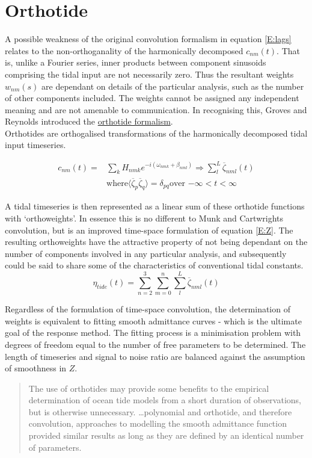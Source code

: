 \section{Orthotide}%
A possible weakness of the original convolution formalism in equation \ref{E:lags} relates to the non-orthoganality of the harmonically decomposed $c_{nm}(t)$.  That is, unlike a Fourier series, inner products between component sinusoids comprising the tidal input are not necessarily zero.   Thus the resultant weights $w_{nm}(s)$ are dependant on details of the particular analysis, such as the number of other components included.  The weights cannot be assigned any independent meaning and are not amenable to communication.  In recognising this, Groves and Reynolds \citep {Groves:1975ky} introduced the \underline{orthotide formalism}.\\
Orthotides are orthogalised transformations of the harmonically decomposed tidal input timeseries.

\begin{align}
c_{nm}(t) =  &\sum_{k} H_{nmk} e^{-i(\omega_{nmk} + \beta_{nml})}  \Rightarrow \sum_{l}^L \overline{\zeta}_{nml}(t)     \nonumber \\
             &\mbox{where} \langle \overline{\zeta}_p \overline{\zeta}_q \rangle  = \delta_{pq}  \mbox{over $-\infty < t < \infty$}             \nonumber
\end{align}

A tidal timeseries is then represented as a linear sum of these orthotide functions with `orthoweights'. In essence this is no different to Munk and Cartwrights convolution, but is an improved time-space formulation of equation \ref{E:Z}.  The resulting orthoweights have the attractive property of not being dependant on the number of components involved in any particular analysis, and subsequently could be said to share some of the characteristics of conventional tidal constants.
\begin{equation}
\label{E:orthosum}
\eta_{tide}(t) = \sum_{n=2}^3 \sum_{m=0}^n \sum_{l}^L \overline{\zeta}_{nml}(t)
\end{equation}

Regardless of the formulation of time-space convolution, the determination of weights is equivalent to fitting smooth admittance curves - which is the ultimate goal of the response method.  The fitting process is a minimisation problem with degrees of freedom equal to the number of free parameters to be determined.    The length of timeseries and signal to noise ratio are balanced against the assumption of smoothness in $Z$.
\begin{quotation}   
The use of orthotides may provide some benefits to the empirical determination of ocean tide models from a short duration of observations, but is otherwise unnecessary. \dots  polynomial and orthotide, and therefore convolution, approaches to modelling the smooth admittance function provided similar results as long as they are defined by an identical number of parameters.\citep{Desai:2006wo}
\end{quotation}
